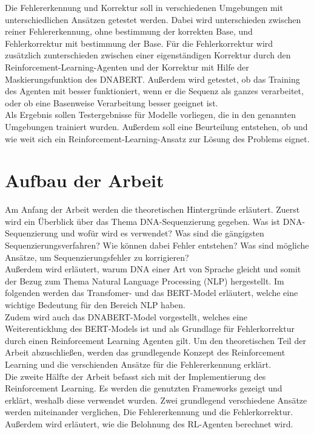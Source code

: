 \documentclass[oneside,bibliography=totocnumbered,BCOR=5mm]{scrbook}%
\theoremstyle{definition}
\theoremstyle{definition}
\theoremstyle{definition}
\theoremstyle{definition}
\theoremstyle{definition}
\theoremstyle{definition}
\begin{document}
Die Fehlererkennung und Korrektur soll in verschiedenen Umgebungen mit unterschiedlichen Ansätzen
getestet werden. Dabei wird unterschieden zwischen reiner Fehlererkennung, ohne bestimmung der
korrekten Base, und Fehlerkorrektur mit bestimmung der Base. Für die Fehlerkorrektur wird zusätzlich
zunterschieden zwischen einer eigenständigen Korrektur durch den Reinforcement-Learning-Agenten und 
der Korrektur mit Hilfe der Maskierungsfunktion des DNABERT.
Außerdem wird getestet, ob das Training des Agenten mit besser funktioniert, wenn er die Sequenz als ganzes verarbeitet,
oder ob eine Basenweise Verarbeitung besser geeignet ist.\\


Als Ergebnis sollen Testergebnisse für Modelle vorliegen, die in den genannten Umgebungen trainiert wurden.
Außerdem soll eine Beurteilung entstehen, ob und wie weit sich ein Reinforcement-Learning-Ansatz 
zur Lösung des Problems eignet.\\
\linebreak[4]

\section{Aufbau der Arbeit}


Am Anfang der Arbeit werden die theoretischen Hintergründe erläutert. 
Zuerst wird ein Überblick über das Thema DNA-Sequenzierung gegeben.
Was ist DNA-Sequenzierung und wofür wird es verwendet?
Was sind die gängigsten Sequenzierungsverfahren?
Wie können dabei Fehler entstehen?
Was sind mögliche Ansätze, um Sequenzierungsfehler zu korrigieren?\\

Außerdem wird erläutert, warum DNA einer Art von Sprache gleicht und 
somit der Bezug zum Thema Natural Language Processing (NLP) hergestellt.
Im folgenden werden das Transfomer- und das BERT-Model erläutert, welche eine wichtige Bedeutung 
für den Bereich NLP haben.\\

Zudem wird auch das DNABERT-Model vorgestellt, welches eine Weiterenticklung des BERT-Models ist 
und als Grundlage für Fehlerkorrektur durch einen Reinforcement Learning Agenten gilt.
Um den theoretischen Teil der Arbeit abzuschließen, werden das grundlegende Konzept des 
Reinforcement Learning und die verschienden Ansätze für die Fehlererkennung erklärt.\\

Die zweite Hälfte der Arbeit befasst sich mit der Implementierung des Reinforcement Learning.
Es werden die genutzten Frameworks gezeigt und erklärt, weshalb diese verwendet wurden.
Zwei grundlegend verschiedene Ansätze werden miteinander verglichen, Die Fehlererkennung und die Fehlerkorrektur.
Außerdem wird erläutert, wie die Belohnung des RL-Agenten berechnet wird. \\
\end{document}
